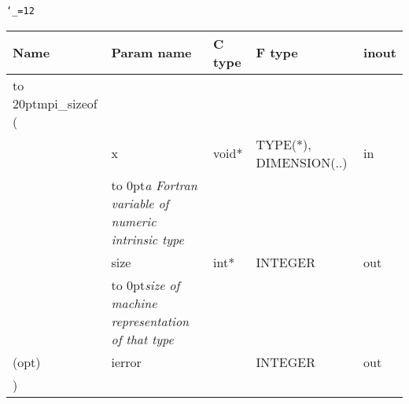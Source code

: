 \begingroup\tt\catcode`\_=12
\begin{tabular}{lllll}
\toprule
\textrm{Name}&\textrm{Param name}&\textrm{C type}&\textrm{F type}&\textrm{inout}\\
\midrule
\hbox to 20pt{mpi_sizeof (\hss} \\
&x&void*&TYPE(*), DIMENSION(..)&in\\ [-3pt]
&\hbox to 0pt{\footnotesize\sl a Fortran variable of numeric intrinsic type\hss}\\
&size&int*&INTEGER&out\\ [-3pt]
&\hbox to 0pt{\footnotesize\sl size of machine representation of that type\hss}\\
(opt)&ierror&&INTEGER&out\\
)\\
\bottomrule
\end{tabular}
\endgroup

